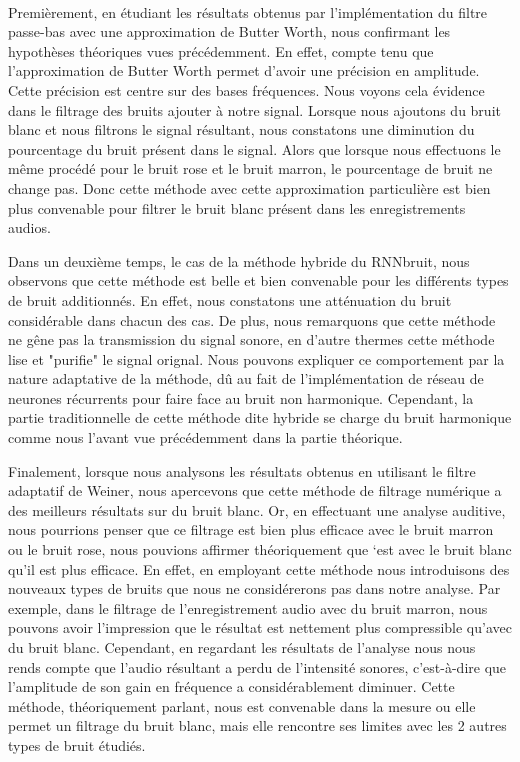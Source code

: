 \documentclass[conference,onecolumn]{IEEEtran}
\begin{document}
\hfill \\
Premièrement, en étudiant les résultats obtenus par l'implémentation du filtre passe-bas avec une approximation de Butter Worth, nous confirmant les hypothèses théoriques vues précédemment. En effet, compte tenu que l’approximation de Butter Worth permet d’avoir une précision en amplitude. Cette précision est centre sur des bases fréquences. Nous voyons cela évidence dans le filtrage des bruits ajouter à notre signal. Lorsque nous ajoutons du bruit blanc et nous filtrons le signal résultant, nous constatons une diminution du pourcentage du bruit présent dans le signal. Alors que lorsque nous effectuons le même procédé pour le bruit rose et le bruit marron, le pourcentage de bruit ne change pas. Donc cette méthode avec cette approximation particulière est bien plus convenable pour filtrer le bruit blanc présent dans les enregistrements audios.

Dans un deuxième temps, le cas de la méthode hybride du RNNbruit, nous observons que cette méthode est belle et bien convenable pour les différents types de bruit additionnés. En effet, nous constatons une atténuation du bruit considérable dans chacun des cas. De plus, nous remarquons que cette méthode ne gêne pas la transmission du signal sonore, en d'autre thermes cette méthode lise et "purifie" le signal orignal. Nous pouvons expliquer ce comportement par la nature adaptative de la méthode, dû au fait de l'implémentation de réseau de neurones récurrents pour faire face au bruit non harmonique. Cependant, la partie traditionnelle de cette méthode dite hybride se charge du bruit harmonique comme nous l'avant vue précédemment dans la partie théorique.

Finalement, lorsque nous analysons les résultats obtenus en utilisant le filtre adaptatif de Weiner, nous apercevons que cette méthode de filtrage numérique a des meilleurs résultats sur du bruit blanc. Or, en effectuant une analyse auditive, nous pourrions penser que ce filtrage est bien plus efficace avec le bruit marron ou le bruit rose, nous pouvions affirmer théoriquement que ‘est avec le bruit blanc qu’il est plus efficace. En effet, en employant cette méthode nous introduisons des nouveaux types de bruits que nous ne considérerons pas dans notre analyse. Par exemple, dans le filtrage de l’enregistrement audio avec du bruit marron, nous pouvons avoir l’impression que le résultat est nettement plus compressible qu’avec du bruit blanc. Cependant, en regardant les résultats de l’analyse nous nous rends compte que l’audio résultant a perdu de l’intensité sonores, c’est-à-dire que l’amplitude de son gain en fréquence a considérablement diminuer. Cette méthode, théoriquement parlant, nous est convenable dans la mesure ou elle permet un filtrage du bruit blanc, mais elle rencontre ses limites avec les 2 autres types de bruit étudiés.
\end{document}

